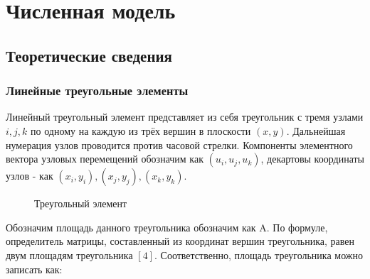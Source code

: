 \documentclass[a4paper, 14pt]{extarticle}
\begin{document}
\newpage

\section{Численная модель}

\subsection{Теоретические сведения}

\subsubsection{Линейные треугольные элементы}

Линейный треугольный элемент представляет из себя треугольник с тремя узлами $i, j, k$ по одному на каждую из трёх вершин в плоскости $(x, y)$. Дальнейшая нумерация узлов проводится против часовой стрелки. Компоненты элементного вектора узловых перемещений обозначим как $\left( u_i, u_j, u_k \right)$, декартовы координаты узлов - как $(x_i, y_i), (x_j, y_j), (x_k, y_k)$. 

\begin{figure}[h]
\caption{Треугольный элемент}
\label{fig:triangle}
\end{figure}

Обозначим площадь данного треугольника обозначим как A. По формуле, определитель матрицы, составленный из координат вершин треугольника, равен двум площадям треугольника $\left[4\right]$. Соответственно, площадь треугольника можно записать как:
\end{document}
